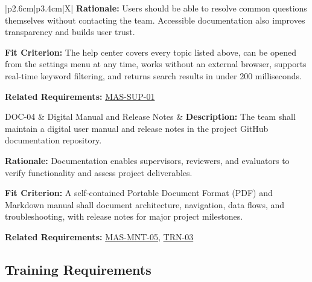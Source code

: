 \documentclass[12pt]{article}
\newcommand{\acr}[3]{\phantomsection\label{acr:#1}#2 (#3)}
\begin{document}
\begin{xltabular}{\textwidth}{|p{2.6cm}|p{3.4cm}|X|}
\textbf{Rationale:} Users should be able to resolve common questions themselves without contacting the team. Accessible documentation also improves transparency and builds user trust.

\textbf{Fit Criterion:} The help center covers every topic listed above, can be opened from the settings menu at any time, works without an external browser, supports real-time keyword filtering, and returns search results in under 200 milliseconds.

\textbf{Related Requirements:} \hyperlink{req:MAS-SUP-01}{MAS-SUP-01}\\
\hline

DOC-04\hypertarget{req:DOC-04}{} &
Digital Manual and Release Notes &
\textbf{Description:} The team shall maintain a digital user manual and release notes in the project GitHub documentation repository.

\textbf{Rationale:} Documentation enables supervisors, reviewers, and evaluators to verify functionality and assess project deliverables.

\textbf{Fit Criterion:} A self-contained \acr{PDF}{Portable Document Format}{PDF} and Markdown manual shall document architecture, navigation, data flows, and troubleshooting, with release notes for major project milestones.

\textbf{Related Requirements:} \hyperlink{req:MAS-MNT-05}{MAS-MNT-05}, \hyperlink{req:TRN-03}{TRN-03}\\
\hline

\end{xltabular}
\subsection{Training Requirements}
\end{document}
